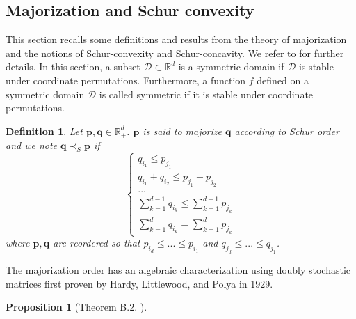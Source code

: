 \documentclass[twoside,11pt]{book}
\newtheorem{proposition}{Proposition}
\newtheorem{definition}{Definition}
\numberwithin{theorem}{chapter}
\numberwithin{definition}{chapter}
\numberwithin{proposition}{chapter}
\numberwithin{corollary}{chapter}
\numberwithin{example}{chapter}
\numberwithin{lemma}{chapter}
\numberwithin{assumption}{chapter}
\numberwithin{equation}{chapter}
\numberwithin{figure}{chapter}
\begin{document}
\begin{subappendices}
\section{Majorization and Schur convexity}
\label{app:majorization}


This section recalls some definitions and results from the theory of majorization and the notions of Schur-convexity and Schur-concavity. We refer to \parencite{MaOlAr11} for further details. In this section, a subset $\mathcal{D} \subset \mathbb{R}^{d}$ is a symmetric domain if $\mathcal{D}$ is stable under coordinate permutations. Furthermore, a function $f$ defined on a symmetric domain $\mathcal{D}$ is called symmetric if it is stable under coordinate permutations.

\begin{definition}\label{def:majorization}
Let $\bm{p},\bm{q} \in \mathbb{R}_{+}^{d}$. $\bm{p}$ is said to majorize $\bm{q}$ according to Schur order and we note $\bm{q} \prec_{S} \bm{p}$ if
\begin{equation}
\left\{
    \begin{array}{ll}
        q_{i_{1}} \leq p_{j_{1}} \\
        q_{i_{1}} + q_{i_{2}} \leq p_{j_{1}} + p_{j_{2}} \\
        ... \\
        \sum\limits_{k=1}^{d-1} q_{i_{k}} \leq \sum\limits_{k=1}^{d-1} p_{j_{k}}\\
        \sum\limits_{k=1}^{d} q_{i_{k}} = \sum\limits_{k=1}^{d} p_{j_{k}}
    \end{array}
\right.
\end{equation}
where $\bm{p},\bm{q}$ are reordered so that $p_{i_{d}} \leq ... \leq p_{i_{1}}$ and $q_{j_{d}} \leq ... \leq q_{j_{1}}$.
\end{definition}
The majorization order has an algebraic characterization using doubly stochastic matrices first proven by Hardy, Littlewood, and Polya in 1929.
\begin{proposition}[Theorem B.2. \citealp{MaOlAr11}]

\end{proposition}
\end{subappendices}
\end{document}
